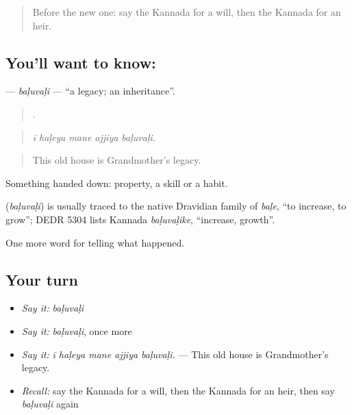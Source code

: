 \label{lesson:KA-C353-baluvali}



\begin{quote}
Before the new one: say the Kannada for a will, then the Kannada for an heir.
\end{quote}

\subsection*{You'll want to know: }
\textbf{} — \emph{baḷuvaḷi} — \textquotedblleft{}a legacy; an inheritance\textquotedblright{}.

\begin{quote}
    .
\end{quote}

\begin{quote}
\emph{ī haḷeya mane ajjiya baḷuvaḷi.}
\end{quote}

\begin{quote}
This old house is Grandmother's legacy.
\end{quote}

Something handed down: property, a skill or a habit.

\begin{cousinweb}
\textbf{} (\emph{baḷuvaḷi}) is usually traced to the native Dravidian family of \emph{baḷe}, \textquotedblleft{}to increase, to grow\textquotedblright{}; DEDR 5304 lists Kannada \emph{baḷuvaḷike}, \textquotedblleft{}increase, growth\textquotedblright{}.
\end{cousinweb}

\begin{grammarlens}[title={What you've built}]
One more word for telling what happened.
\end{grammarlens}

\subsection*{Your turn}
\begin{itemize}
\raggedright
  \item \emph{Say it:} \emph{baḷuvaḷi}
  \item \emph{Say it:} \emph{baḷuvaḷi}, once more
  \item \emph{Say it:} \emph{ī haḷeya mane ajjiya baḷuvaḷi.} — This old house is Grandmother's legacy.
  \item \emph{Recall:} say the Kannada for a will, then the Kannada for an heir, then say \emph{baḷuvaḷi} again
\end{itemize}

